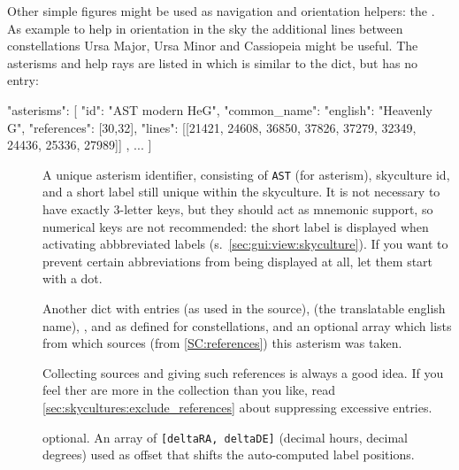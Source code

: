 Other simple figures might be used as navigation and orientation helpers: the . 
As example to help in orientation in the sky the additional lines between constellations 
Ursa Major, Ursa Minor and Cassiopeia might be useful. The asterisms and help rays are listed in
 which is similar to the  dict, but has no  entry:

\begin{jsonfile}[\scriptsize]
"asterisms": [
    {
      "id": "AST modern HeG",
      "common_name": {"english": "Heavenly G", "references": [30,32]},
      "lines": [[21421, 24608, 36850, 37826, 37279, 32349, 24436, 25336, 27989]]
    }, ...
]
\end{jsonfile}

\begin{description}
\item[] A unique asterism identifier, consisting of \texttt{AST} (for asterism), skyculture id, and a short label still unique within the skyculture.
                 It is not necessary to have exactly 3-letter keys, but they should act as mnemonic support, so numerical keys are not recommended:  
				 the short label is displayed when activating abbbreviated labels (s.~\ref{sec:gui:view:skyculture}). If you want to prevent
				 certain abbreviations from being displayed at all, let them start with a dot. 				 
\item[] Another dict with entries  (as used in the source),  (the translatable english name), 
                ,  and  as defined for constellations,
				and an optional array  which lists from which sources (from \ref{SC:references}) this asterism was taken. 

				Collecting sources and giving such references is always a good idea. If you feel ther are more in the collection than you like, 
				read \ref{sec:skycultures:exclude_references} about suppressing excessive entries.
				
\item[] optional. An array of \texttt{[deltaRA, deltaDE]} (decimal hours, decimal degrees) 
                            used as offset that shifts the auto-computed label positions. 
				

\end{description}

